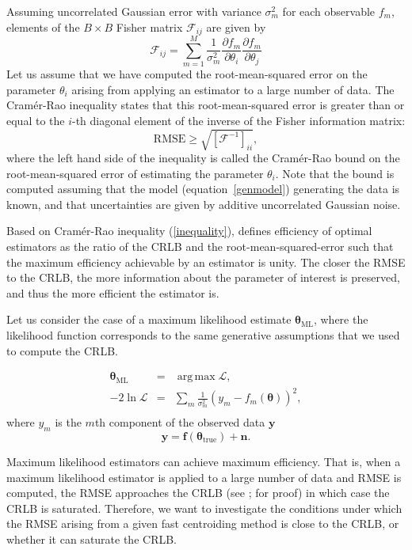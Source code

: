 \documentclass[onecolumn]{aastex61}
\DeclareMathOperator*{\argmax}{arg\,max}
\newcommand{\beq}{\begin{equation}}
\newcommand{\eeq}{\end{equation}}
\newcommand{\todo}[1]{{\textcolor{dred}{ #1}}}
\begin{document}
Assuming uncorrelated Gaussian error with variance $\sigma^{2}_{m}$ for each observable $f_{m}$, elements
of the $B\times B$ Fisher matrix $\mathcal{F}_{ij}$ are given by
\beq
\mathcal{F}_{ij} = \sum_{m=1}^{M}\frac{1}{\sigma_{m}^{2}}\frac{\partial f_{m}}{\partial \theta_{i}}\frac{\partial f_{m}}{\partial \theta_{j}}
\label{fisher}
\eeq
Let us assume that we have computed the root-mean-squared error on the parameter $\theta_{i}$ arising from applying an estimator to a large number of data. The Cram\'{e}r-Rao inequality states that this root-mean-squared error is greater than or equal to the $i$-th diagonal element of the inverse of the Fisher information matrix:
\beq
\text{RMSE} \geq \sqrt{[\mathcal{F}^{-1}]_{ii}},
\label{inequality}
\eeq
where the left hand side of the inequality is called the Cram\'{e}r-Rao bound on 
the root-mean-squared error of estimating the parameter $\theta_{i}$. Note that 
the bound is computed assuming that the model (equation~\ref{genmodel}) generating the data 
is known, and that uncertainties are given by additive uncorrelated Gaussian noise.

Based on Cram\'{e}r-Rao inequality (\ref{inequality}), \citet{crlb} defines efficiency of optimal estimators as the ratio of the CRLB and the root-mean-squared-error such that the maximum efficiency 
achievable by an estimator is unity. The closer the RMSE to the CRLB, 
the more information about the parameter of interest is preserved, and thus the more efficient the estimator is. 

Let us consider the case of a maximum likelihood estimate $\boldsymbol{\mathbf{\theta}}_{\text{ML}}$, 
where the likelihood function corresponds to the same generative assumptions that we used to compute the CRLB.

\begin{eqnarray}
\boldsymbol{\mathbf{\theta}}_{\text{ML}} &=& \argmax \mathcal{L}, \\
-2\ln \mathcal{L} &=& \sum_{m}\frac{1}{\sigma_{m}^{2}}( y_{m} - f_{m}(\boldsymbol{\mathbf{\theta}}))^{2}, \\
\end{eqnarray}
where $y_{m}$ is the $m$th component of the observed data $\mathbf{y}$
\beq
\mathbf{y} = \mathbf{f}(\boldsymbol{\mathbf{\theta}}_{\text{true}}) + \mathbf{n}.
\eeq

Maximum likelihood estimators can achieve maximum efficiency. \todo{That is, when a maximum likelihood %
estimator is applied to a large number of data and RMSE is computed, the RMSE approaches the CRLB (see
\citealt{crlb}; \citealt{lecam} for proof) in which case the CRLB is saturated.} \todo{Therefore, we want to investigate the conditions under which the RMSE arising from a given fast centroiding method is close to the CRLB, or whether it can saturate the CRLB.}
\end{document}

